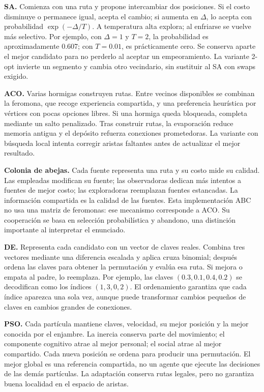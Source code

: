 \documentclass[
  spanish,
  12pt,
]{article}
\begin{document}
\textbf{SA.} Comienza con una ruta y propone intercambiar dos posiciones. Si el costo disminuye o permanece igual, acepta el cambio; si aumenta en $\Delta$, lo acepta con probabilidad $\exp(-\Delta/T)$. A temperatura alta explora; al enfriarse se vuelve más selectivo. Por ejemplo, con $\Delta=1$ y $T=2$, la probabilidad es aproximadamente 0.607; con $T=0.01$, es prácticamente cero. Se conserva aparte el mejor candidato para no perderlo al aceptar un empeoramiento. La variante 2-opt invierte un segmento y cambia otro vecindario, sin sustituir al SA con swaps exigido.

\textbf{ACO.} Varias hormigas construyen rutas. Entre vecinos disponibles se combinan la feromona, que recoge experiencia compartida, y una preferencia heurística por vértices con pocas opciones libres. Si una hormiga queda bloqueada, completa mediante un salto penalizado. Tras construir rutas, la evaporación reduce memoria antigua y el depósito refuerza conexiones prometedoras. La variante con búsqueda local intenta corregir aristas faltantes antes de actualizar el mejor resultado.

\textbf{Colonia de abejas.} Cada fuente representa una ruta y su costo mide su calidad. Las empleadas modifican su fuente; las observadoras dedican más intentos a fuentes de mejor costo; las exploradoras reemplazan fuentes estancadas. La información compartida es la calidad de las fuentes. Esta implementación ABC no usa una matriz de feromonas: ese mecanismo corresponde a ACO. Su cooperación se basa en selección probabilística y abandono, una distinción importante al interpretar el enunciado.

\textbf{DE.} Representa cada candidato con un vector de claves reales. Combina tres vectores mediante una diferencia escalada y aplica cruza binomial; después ordena las claves para obtener la permutación y evalúa esa ruta. Si mejora o empata al padre, lo reemplaza. Por ejemplo, las claves $(0.3,0.1,0.4,0.2)$ se decodifican como los índices $(1,3,0,2)$. El ordenamiento garantiza que cada índice aparezca una sola vez, aunque puede transformar cambios pequeños de claves en cambios grandes de conexiones.

\textbf{PSO.} Cada partícula mantiene claves, velocidad, su mejor posición y la mejor conocida por el enjambre. La inercia conserva parte del movimiento; el componente cognitivo atrae al mejor personal; el social atrae al mejor compartido. Cada nueva posición se ordena para producir una permutación. El mejor global es una referencia compartida, no un agente que ejecute las decisiones de las demás partículas. La adaptación conserva rutas legales, pero no garantiza buena localidad en el espacio de aristas.
\end{document}
